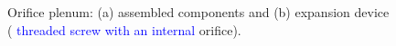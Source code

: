 \documentclass[review,preprint,12pt]{elsarticle}
\begin{document}
\begin{figure}[!htp]
\centering
{}
\hfil
{}
\caption{Orifice plenum: (a) assembled components and (b) expansion device ( \textcolor{blue}{threaded screw with an internal} orifice).}
\label{fig:Figure_3}
\end{figure} 
\end{document}
